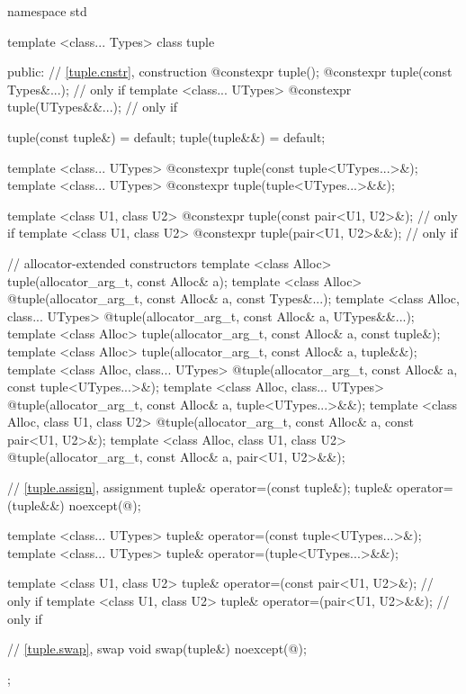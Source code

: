 \begin{codeblock}
namespace std {
  template <class... Types>
    class tuple  {
    public:
      // \ref{tuple.cnstr},  construction
      @\EXPLICIT@ constexpr tuple();
      @\EXPLICIT@ constexpr tuple(const Types&...);         // only if 
      template <class... UTypes>
        @\EXPLICIT@ constexpr tuple(UTypes&&...);           // only if 

      tuple(const tuple&) = default;
      tuple(tuple&&) = default;

      template <class... UTypes>
        @\EXPLICIT@ constexpr tuple(const tuple<UTypes...>&);
      template <class... UTypes>
        @\EXPLICIT@ constexpr tuple(tuple<UTypes...>&&);

      template <class U1, class U2>
        @\EXPLICIT@ constexpr tuple(const pair<U1, U2>&);   // only if 
      template <class U1, class U2>
        @\EXPLICIT@ constexpr tuple(pair<U1, U2>&&);        // only if 

      // allocator-extended constructors
      template <class Alloc>
        tuple(allocator_arg_t, const Alloc& a);
      template <class Alloc>
        @\EXPLICIT@ tuple(allocator_arg_t, const Alloc& a, const Types&...);
      template <class Alloc, class... UTypes>
        @\EXPLICIT@ tuple(allocator_arg_t, const Alloc& a, UTypes&&...);
      template <class Alloc>
        tuple(allocator_arg_t, const Alloc& a, const tuple&);
      template <class Alloc>
        tuple(allocator_arg_t, const Alloc& a, tuple&&);
      template <class Alloc, class... UTypes>
        @\EXPLICIT@ tuple(allocator_arg_t, const Alloc& a, const tuple<UTypes...>&);
      template <class Alloc, class... UTypes>
        @\EXPLICIT@ tuple(allocator_arg_t, const Alloc& a, tuple<UTypes...>&&);
      template <class Alloc, class U1, class U2>
        @\EXPLICIT@ tuple(allocator_arg_t, const Alloc& a, const pair<U1, U2>&);
      template <class Alloc, class U1, class U2>
        @\EXPLICIT@ tuple(allocator_arg_t, const Alloc& a, pair<U1, U2>&&);

      // \ref{tuple.assign},  assignment
      tuple& operator=(const tuple&);
      tuple& operator=(tuple&&) noexcept(@\seebelow@);

      template <class... UTypes>
        tuple& operator=(const tuple<UTypes...>&);
      template <class... UTypes>
        tuple& operator=(tuple<UTypes...>&&);

      template <class U1, class U2>
        tuple& operator=(const pair<U1, U2>&);              // only if 
      template <class U1, class U2>
        tuple& operator=(pair<U1, U2>&&);                   // only if 

      // \ref{tuple.swap},  swap
      void swap(tuple&) noexcept(@\seebelow@);
    };
}
\end{codeblock}

